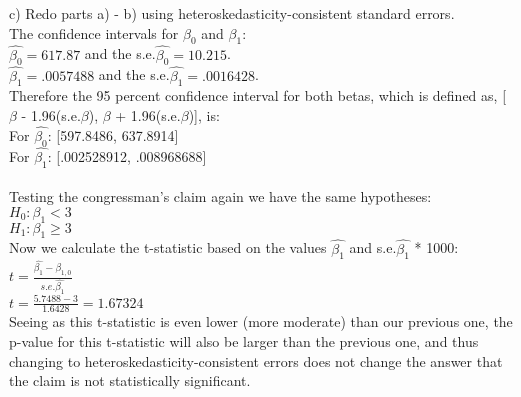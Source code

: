 \documentclass[11pt, oneside]{article}   	%
\begin{document}
c) Redo parts a) - b) using heteroskedasticity-consistent standard errors.\\
The confidence intervals for $\beta_0$ and $\beta_1$:\\
$\hat{\beta_0} = 617.87$ and the s.e.$\hat{\beta_0} = 10.215$.\\
$\hat{\beta_1} = .0057488$ and the s.e.$\hat{\beta_1} = .0016428$.\\
Therefore the 95 percent confidence interval for both betas, which is defined as, [$\beta$ - 1.96(s.e.$\beta$), $\beta$ + 1.96(s.e.$\beta$)], is:\\
For $\hat{\beta_0}$: [597.8486, 637.8914]\\
For $\hat{\beta_1}$: [.002528912, .008968688]\\~\\
Testing the congressman's claim again we have the same hypotheses:\\
$H_0: \beta_1 < 3$\\
$H_1: \beta_1 \geq 3$\\
Now we calculate the t-statistic based on the values $\hat{\beta_1}$ and s.e.$\hat{\beta_1}$ * 1000:\\
$t = \frac{\hat{\beta_1} - \beta_{1,0}}{s.e.\hat{\beta_1}}$\\
$t = \frac{5.7488 - 3}{1.6428} = 1.67324$\\
Seeing as this t-statistic is even lower (more moderate) than our previous one, the p-value for this t-statistic will also be larger than the previous one, and thus changing to heteroskedasticity-consistent errors does not change the answer that the claim is not statistically significant.\\
\end{document}
